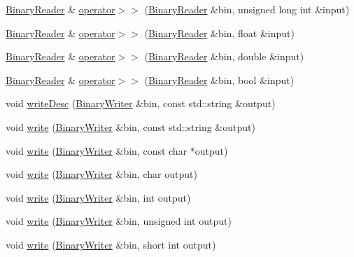 \begin{DoxyCompactItemize}
\item 
\mbox{\hyperlink{classADATIO_1_1BinaryReader}{Binary\+Reader}} \& \mbox{\hyperlink{namespaceADATIO_a60c265c9f81ae202821e863e6db5f56f}{operator$>$$>$}} (\mbox{\hyperlink{classADATIO_1_1BinaryReader}{Binary\+Reader}} \&bin, unsigned long int \&input)
\item 
\mbox{\hyperlink{classADATIO_1_1BinaryReader}{Binary\+Reader}} \& \mbox{\hyperlink{namespaceADATIO_a61d7b17123532c52a896c68a7524e924}{operator$>$$>$}} (\mbox{\hyperlink{classADATIO_1_1BinaryReader}{Binary\+Reader}} \&bin, float \&input)
\item 
\mbox{\hyperlink{classADATIO_1_1BinaryReader}{Binary\+Reader}} \& \mbox{\hyperlink{namespaceADATIO_a2f66b1bc36b75ce131795f596985e5dc}{operator$>$$>$}} (\mbox{\hyperlink{classADATIO_1_1BinaryReader}{Binary\+Reader}} \&bin, double \&input)
\item 
\mbox{\hyperlink{classADATIO_1_1BinaryReader}{Binary\+Reader}} \& \mbox{\hyperlink{namespaceADATIO_a540603b862dd578f7d9e187b2a0b7380}{operator$>$$>$}} (\mbox{\hyperlink{classADATIO_1_1BinaryReader}{Binary\+Reader}} \&bin, bool \&input)
\item 
void \mbox{\hyperlink{namespaceADATIO_a0faeed900aacb29febaa709323135c50}{write\+Desc}} (\mbox{\hyperlink{classADATIO_1_1BinaryWriter}{Binary\+Writer}} \&bin, const std\+::string \&output)
\item 
void \mbox{\hyperlink{namespaceADATIO_a12d01adc4b592d85f0f5f5c101205c08}{write}} (\mbox{\hyperlink{classADATIO_1_1BinaryWriter}{Binary\+Writer}} \&bin, const std\+::string \&output)
\item 
void \mbox{\hyperlink{namespaceADATIO_a7a53460de240b5544de0b7c60b2eb455}{write}} (\mbox{\hyperlink{classADATIO_1_1BinaryWriter}{Binary\+Writer}} \&bin, const char $\ast$output)
\item 
void \mbox{\hyperlink{namespaceADATIO_a36dc30e1303b7d207fefebf8d5d5eb6e}{write}} (\mbox{\hyperlink{classADATIO_1_1BinaryWriter}{Binary\+Writer}} \&bin, char output)
\item 
void \mbox{\hyperlink{namespaceADATIO_acd8820f167370337965f2788946e6cd1}{write}} (\mbox{\hyperlink{classADATIO_1_1BinaryWriter}{Binary\+Writer}} \&bin, int output)
\item 
void \mbox{\hyperlink{namespaceADATIO_a4414db50c6a20ca89996529421eb8d0b}{write}} (\mbox{\hyperlink{classADATIO_1_1BinaryWriter}{Binary\+Writer}} \&bin, unsigned int output)
\item 
void \mbox{\hyperlink{namespaceADATIO_a89bfc18eb2d40012f5b4ac105448d441}{write}} (\mbox{\hyperlink{classADATIO_1_1BinaryWriter}{Binary\+Writer}} \&bin, short int output)

\end{DoxyCompactItemize}
